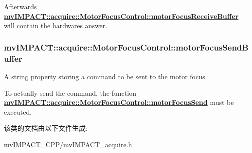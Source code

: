 Afterwards {\bfseries \hyperlink{classmv_i_m_p_a_c_t_1_1acquire_1_1_motor_focus_control_ae1318dcd821e35abdb35337352d1c5b6}{mv\+I\+M\+P\+A\+C\+T\+::acquire\+::\+Motor\+Focus\+Control\+::motor\+Focus\+Receive\+Buffer}} will contain the hardwares answer. \hypertarget{classmv_i_m_p_a_c_t_1_1acquire_1_1_motor_focus_control_a4670bcf5c3ffe82afc04de1deaea292e}{
\subsubsection[{motor\+Focus\+Send\+Buffer}]{ mv\+I\+M\+P\+A\+C\+T\+::acquire\+::\+Motor\+Focus\+Control\+::motor\+Focus\+Send\+Buffer}}\label{classmv_i_m_p_a_c_t_1_1acquire_1_1_motor_focus_control_a4670bcf5c3ffe82afc04de1deaea292e}


A string property storing a command to be sent to the motor focus. 

To actually send the command, the function {\bfseries \hyperlink{classmv_i_m_p_a_c_t_1_1acquire_1_1_motor_focus_control_a52ccaf1b60154618b17112d50209cee3}{mv\+I\+M\+P\+A\+C\+T\+::acquire\+::\+Motor\+Focus\+Control\+::motor\+Focus\+Send}} must be executed. 

该类的文档由以下文件生成\+:\begin{DoxyCompactItemize}
\item 
mv\+I\+M\+P\+A\+C\+T\+\_\+\+C\+P\+P/mv\+I\+M\+P\+A\+C\+T\+\_\+acquire.\+h\end{DoxyCompactItemize}
